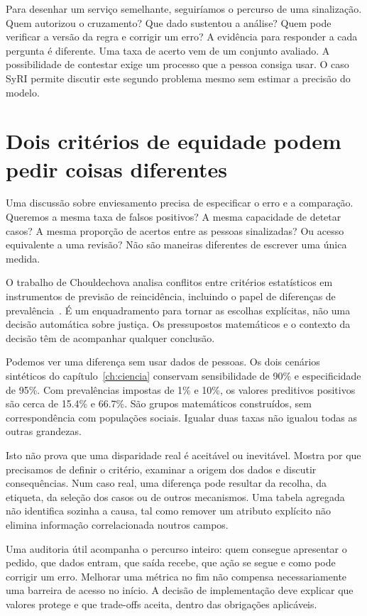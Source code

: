 Para desenhar um serviço semelhante, seguiríamos o percurso de uma sinalização. Quem autorizou o cruzamento? Que dado sustentou a análise? Quem pode verificar a versão da regra e corrigir um erro? A evidência para responder a cada pergunta é diferente. Uma taxa de acerto vem de um conjunto avaliado. A possibilidade de contestar exige um processo que a pessoa consiga usar. O caso SyRI permite discutir este segundo problema mesmo sem estimar a precisão do modelo.

\section{Dois critérios de equidade podem pedir coisas diferentes}
Uma discussão sobre enviesamento precisa de especificar o erro e a comparação. Queremos a mesma taxa de falsos positivos? A mesma capacidade de detetar casos? A mesma proporção de acertos entre as pessoas sinalizadas? Ou acesso equivalente a uma revisão? Não são maneiras diferentes de escrever uma única medida.

O trabalho de Chouldechova analisa conflitos entre critérios estatísticos em instrumentos de previsão de reincidência, incluindo o papel de diferenças de prevalência~\citep{chouldechova2017}. É um enquadramento para tornar as escolhas explícitas, não uma decisão automática sobre justiça. Os pressupostos matemáticos e o contexto da decisão têm de acompanhar qualquer conclusão.

Podemos ver uma diferença sem usar dados de pessoas. Os dois cenários sintéticos do capítulo~\ref{ch:ciencia} conservam sensibilidade de 90\% e especificidade de 95\%. Com prevalências impostas de 1\% e 10\%, os valores preditivos positivos são cerca de 15.4\% e 66.7\%. São grupos matemáticos construídos, sem correspondência com populações sociais. Igualar duas taxas não igualou todas as outras grandezas.

Isto não prova que uma disparidade real é aceitável ou inevitável. Mostra por que precisamos de definir o critério, examinar a origem dos dados e discutir consequências. Num caso real, uma diferença pode resultar da recolha, da etiqueta, da seleção dos casos ou de outros mecanismos. Uma tabela agregada não identifica sozinha a causa, tal como remover um atributo explícito não elimina informação correlacionada noutros campos.

Uma auditoria útil acompanha o percurso inteiro: quem consegue apresentar o pedido, que dados entram, que saída recebe, que ação se segue e como pode corrigir um erro. Melhorar uma métrica no fim não compensa necessariamente uma barreira de acesso no início. A decisão de implementação deve explicar que valores protege e que trade-offs aceita, dentro das obrigações aplicáveis.

